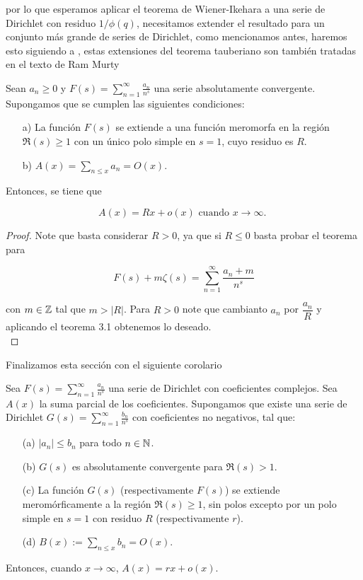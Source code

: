 por lo que esperamos aplicar el teorema de Wiener-Ikehara a una serie de Dirichlet con residuo $1/\phi(q)$, necesitamos extender el resultado para un conjunto más grande de series de Dirichlet, como mencionamos antes, haremos esto siguiendo a \cite{vatwani2015simple}, estas extensiones del teorema tauberiano son también tratadas en el texto de Ram Murty \cite{murty2007problems}

\begin{corollary}
    Sean $a_n \geq 0$ y $F(s)=\displaystyle\sum_{n=1}^{\infty} \frac{a_n}{n^s}$ una serie absolutamente convergente. Supongamos que se cumplen las siguientes condiciones:

\begin{itemize}
\item[a)] La función $F(s)$ se extiende a una función meromorfa en la región $\Re(s) \geq 1$ con un único polo simple en $s=1$, cuyo residuo es $R$.
\item[b)] $A(x)=\displaystyle \sum_{n \leq x} a_n=O(x)$.
\end{itemize}


Entonces, se tiene que

$$
A(x)=Rx+o(x) \text { cuando } x \rightarrow \infty \text {. }
$$
\end{corollary}

\begin{proof}
    Note que basta considerar $R> 0$, ya que si $R\leq 0$ basta probar el teorema para 

    $$F(s)+m\zeta(s)=\sum_{n=1}^{\infty} \frac{a_n+m}{n^s}$$

    con $m\in \mathbb{Z}$ tal que $m>|R|$. Para $R>0$ note que cambianto $a_n$ por $\dfrac{a_n}{R}$ y aplicando el teorema 3.1 obtenemos lo deseado.\\
\end{proof}

Finalizamos esta sección con el siguiente corolario

\begin{corollary}
Sea $
F(s) =\displaystyle \sum_{n=1}^{\infty} \frac{a_n}{n^s}
$ una serie de Dirichlet con coeficientes complejos. Sea $A(x)$ la suma parcial de los coeficientes. Supongamos que existe una serie de Dirichlet $
G(s) = \displaystyle\sum_{n=1}^{\infty} \frac{b_n}{n^s}
$ con coeficientes no negativos, tal que:  

\begin{itemize}
    \item[(a)] $\left|a_n\right| \leq b_n$ para todo $n\in \mathbb{N}$.
    \item[(b)] $G(s)$ es absolutamente convergente para $\Re(s) > 1$.
    \item[(c)] La función $G(s)$ (respectivamente $F(s)$) se extiende meromórficamente a la región $\Re(s) \geq 1$, sin polos excepto por un polo simple en $s = 1$ con residuo $R$ (respectivamente $r$).
    \item[(d)] $B(x):=\displaystyle\sum_{n \leq x}b_n=O(x)$.
\end{itemize}

Entonces, cuando $x \rightarrow \infty$, $
A(x) = r x + o(x).
$
\end{corollary}


